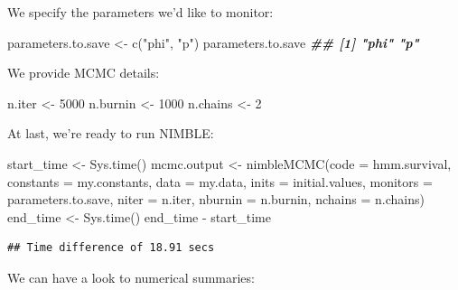 \documentclass[
  12pt,
]{krantz}
\newenvironment{Shaded}{\begin{snugshade}}{\end{snugshade}}
\newcommand{\AttributeTok}[1]{\textcolor[rgb]{0.77,0.63,0.00}{#1}}
\newcommand{\DecValTok}[1]{\textcolor[rgb]{0.00,0.00,0.81}{#1}}
\newcommand{\DocumentationTok}[1]{\textcolor[rgb]{0.56,0.35,0.01}{\textbf{\textit{#1}}}}
\newcommand{\FunctionTok}[1]{\textcolor[rgb]{0.00,0.00,0.00}{#1}}
\newcommand{\NormalTok}[1]{#1}
\newcommand{\OtherTok}[1]{\textcolor[rgb]{0.56,0.35,0.01}{#1}}
\newcommand{\SpecialCharTok}[1]{\textcolor[rgb]{0.00,0.00,0.00}{#1}}
\newcommand{\StringTok}[1]{\textcolor[rgb]{0.31,0.60,0.02}{#1}}
\begin{document}
We specify the parameters we'd like to monitor:

\begin{Shaded}
\begin{Highlighting}[]
\NormalTok{parameters.to.save }\OtherTok{\textless{}{-}} \FunctionTok{c}\NormalTok{(}\StringTok{"phi"}\NormalTok{, }\StringTok{"p"}\NormalTok{)}
\NormalTok{parameters.to.save}
\DocumentationTok{\#\# [1] "phi" "p"}
\end{Highlighting}
\end{Shaded}

We provide MCMC details:

\begin{Shaded}
\begin{Highlighting}[]
\NormalTok{n.iter }\OtherTok{\textless{}{-}} \DecValTok{5000}
\NormalTok{n.burnin }\OtherTok{\textless{}{-}} \DecValTok{1000}
\NormalTok{n.chains }\OtherTok{\textless{}{-}} \DecValTok{2}
\end{Highlighting}
\end{Shaded}

At last, we're ready to run NIMBLE:

\begin{Shaded}
\begin{Highlighting}[]
\NormalTok{start\_time }\OtherTok{\textless{}{-}} \FunctionTok{Sys.time}\NormalTok{()}
\NormalTok{mcmc.output }\OtherTok{\textless{}{-}} \FunctionTok{nimbleMCMC}\NormalTok{(}\AttributeTok{code =}\NormalTok{ hmm.survival,}
                          \AttributeTok{constants =}\NormalTok{ my.constants,}
                          \AttributeTok{data =}\NormalTok{ my.data,}
                          \AttributeTok{inits =}\NormalTok{ initial.values,}
                          \AttributeTok{monitors =}\NormalTok{ parameters.to.save,}
                          \AttributeTok{niter =}\NormalTok{ n.iter,}
                          \AttributeTok{nburnin =}\NormalTok{ n.burnin,}
                          \AttributeTok{nchains =}\NormalTok{ n.chains)}
\NormalTok{end\_time }\OtherTok{\textless{}{-}} \FunctionTok{Sys.time}\NormalTok{()}
\NormalTok{end\_time }\SpecialCharTok{{-}}\NormalTok{ start\_time}
\end{Highlighting}
\end{Shaded}

\begin{verbatim}
## Time difference of 18.91 secs
\end{verbatim}

We can have a look to numerical summaries:
\end{document}
